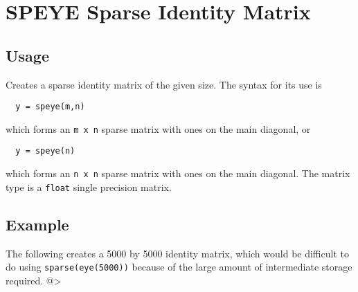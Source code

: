 \section{SPEYE Sparse Identity Matrix}

\subsection{Usage}

Creates a sparse identity matrix of the given size.  The syntax for
its use is
\begin{verbatim}
  y = speye(m,n)
\end{verbatim}
which forms an \verb|m x n| sparse matrix with ones on the main diagonal,
or
\begin{verbatim}
  y = speye(n)
\end{verbatim}
which forms an \verb|n x n| sparse matrix with ones on the main diagonal.  The
matrix type is a \verb|float| single precision matrix.
\subsection{Example}

The following creates a 5000 by 5000 identity matrix, which would be
difficult to do using \verb|sparse(eye(5000))| because of the large amount
of intermediate storage required.
@>
